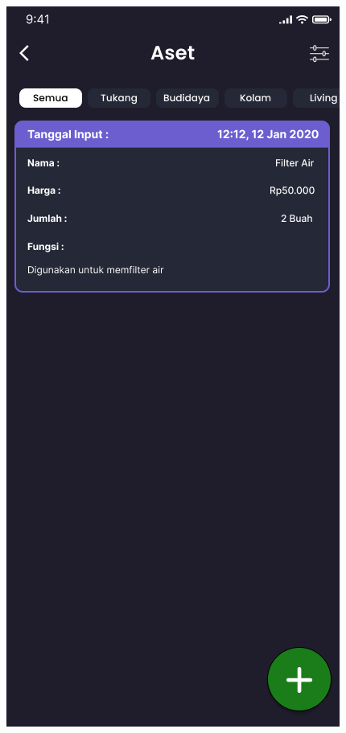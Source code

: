 \begin{spacing}{1.5}
	\begin{figure}[H]
		\hspace{.15\linewidth}
			\includegraphics[width=\linewidth]{gambar/sprint1/mockup_list_aset.png}

\end{figure}
\end{spacing}
